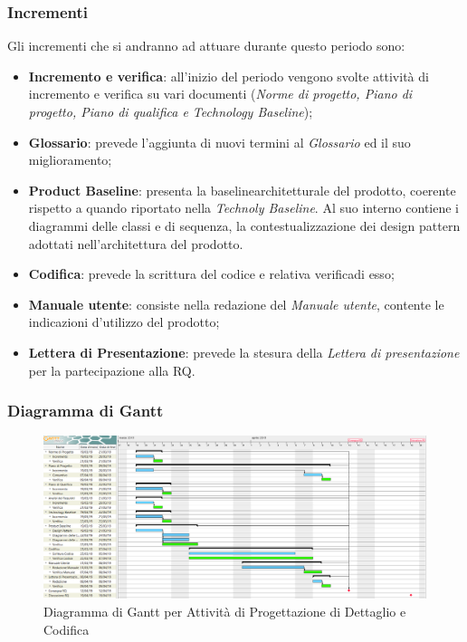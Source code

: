 \subsubsection{Incrementi}
Gli incrementi che si andranno ad attuare durante questo periodo sono:
\begin{itemize}
	\item \textbf{Incremento e verifica}: all'inizio del periodo vengono svolte attività di incremento e verifica su vari documenti (\textit{Norme di progetto, Piano di progetto, Piano di qualifica e Technology Baseline});
	\item \textbf{Glossario}: prevede l'aggiunta di nuovi termini al \textit{Glossario} ed il suo miglioramento;
	\item \textbf{Product Baseline}\glossario: presenta la baseline\glossario architetturale del prodotto, coerente rispetto a quando riportato nella \textit{Technoly Baseline}. Al suo interno contiene i diagrammi delle classi e di sequenza, la contestualizzazione dei design pattern adottati nell'architettura del prodotto. 
	\item \textbf{Codifica}: prevede la scrittura del codice e relativa verifica\glossario di esso;
	\item \textbf{Manuale utente}: consiste nella redazione del \textit{Manuale utente}, contente le indicazioni d'utilizzo del prodotto;
	\item \textbf{Lettera di Presentazione}: prevede la stesura della \textit{Lettera di presentazione} per la partecipazione alla RQ.
\end{itemize}


\begin{landscape}
\subsubsection{Diagramma di Gantt}
\begin{figure}[h]
	\centering
  		\includegraphics[width=1.0\linewidth]{./images/DettaglioeCodifica.png}
  		\caption{Diagramma di Gantt per Attività di Progettazione di Dettaglio e Codifica}
  		\label{fig:Gantt Progettazione di dettaglio e codifica}
\end{figure}
\end{landscape}


